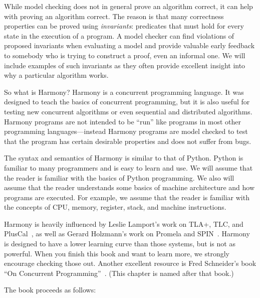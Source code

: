 \documentclass{report}
\begin{document}
While model checking does not in general prove an algorithm correct,
it can help with proving an algorithm correct.
The reason is that many correctness properties can be proved using
\emph{invariants}:
%
predicates that must hold for every state in the
execution of a program.  A model checker can find violations of
proposed invariants when evaluating a model and provide valuable early
feedback to somebody who is trying to construct a proof, even an
informal one.
We will include examples
of such invariants as they often provide excellent insight into
why a particular algorithm works.

So what is Harmony?
Harmony is a concurrent programming language.  It was designed to teach
the basics of concurrent programming, but it is also useful for
testing new concurrent algorithms or even sequential and distributed
algorithms.  Harmony programs are not intended to be ``run'' like programs
in most other programming languages---instead Harmony programs are
model checked to test that the program has certain desirable
properties and does not suffer from bugs.

The syntax and semantics of Harmony is similar to that of Python.
Python is familiar to many programmers and is easy to learn and
use.  We will assume that the reader is familiar with the basics
of Python programming.  We also will assume that the reader
understands some basics of machine architecture and how programs
are executed.  For example, we assume that the reader is familiar
with the concepts of CPU, memory, register, stack, and machine
instructions.

Harmony is heavily influenced by Leslie Lamport's work on
TLA+, TLC, and PlusCal~\cite{Lamport02, Lamport09}, as well as
Gerard Holzmann's work on Promela and SPIN~\cite{SPIN}.
Harmony is designed to have a lower learning curve than those
systems, but is not as powerful.  When you finish this book
and want to learn more, we strongly encourage checking
those out.
Another excellent resource is Fred Schneider's book ``On
Concurrent Programming''~\cite{Schneider97}.
(This chapter is named after that book.)

The book proceeds as follows:
\end{document}
